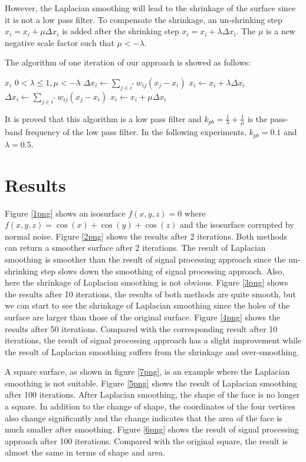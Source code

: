 \documentclass[conference]{IEEEtran}
\begin{document}
However, the Laplacian smoothing will lead to the shrinkage of the surface since it is not a low pass filter. To compensate the shrinkage, an un-shrinking step $x_i=x_i+\mu\Delta x_i$ is added after the shrinking step $x_i=x_i+\lambda\Delta x_i$. The $\mu$ is a new negative scale factor such that $\mu<-\lambda$.

The algorithm of one iteration of our approach is showed as follows:
\begin{algorithmic}
	\REQUIRE $x_i$
	\ENSURE $0<\lambda\leq1, \mu<-\lambda$
	\STATE 	$\Delta x_i \leftarrow \sum_{j\in i^*}w_{ij}(x_j-x_i)$
	\ENDFOR
	\STATE  $x_i\leftarrow x_i+\lambda\Delta x_i$
	\ENDFOR
	\STATE 	$\Delta x_i \leftarrow \sum_{j\in i^*}w_{ij}(x_j-x_i)$
	\ENDFOR
	\STATE  $x_i\leftarrow x_i+\mu\Delta x_i$
	\ENDFOR
\end{algorithmic}

It is proved that this algorithm is a low pass filter \cite{taubin1995signal} and $k_{pb} = \frac{1}{\lambda}+\frac{1}{\mu}$ is the pass-band frequency of the low pass filter. In the following experiments, $k_{pb}=0.1$ and $\lambda=0.5$.

\section{Results}
Figure \ref{1png} shows an isosurface $f(x,y,z)=0$ where $f(x,y,z)=\cos(x)+\cos(y)+\cos(z)$ and the isosurface corrupted by normal noise. Figure \ref{2png} shows the results after 2 iterations. Both methods can return a smoother surface after 2 iterations. The result of Laplacian smoothing is smoother than the result of signal processing approach since the un-shrinking step slows down the smoothing of signal processing approach. Also, here the shrinkage of Laplacian smoothing is not obvious. Figure \ref{3png} shows the results after 10 iterations, the results of both methods are quite smooth, but we can start to see the shrinkage of Laplacian smoothing since the holes of the surface are larger than those of the original surface. Figure \ref{4png} shows the results after 50 iterations. Compared with the corresponding result after 10 iterations, the result of signal processing approach has a slight improvement while the result of Laplacian smoothing suffers from the shrinkage and over-smoothing.

A square surface, as shown in figure \ref{7png}, is an example where the Laplacian smoothing is not suitable. Figure \ref{5png} shows the result of Laplacian smoothing after 100 iterations. After Laplacian smoothing, the shape of the face is no longer a square. In addition to the change of shape, the coordinates of the four vertices also change significantly and the change indicates that the area of the face is much smaller after smoothing. Figure \ref{6png} shows the result of signal processing approach after 100 iterations. Compared with the original square, the result is almost the same in terms of shape and area.
\end{document}
